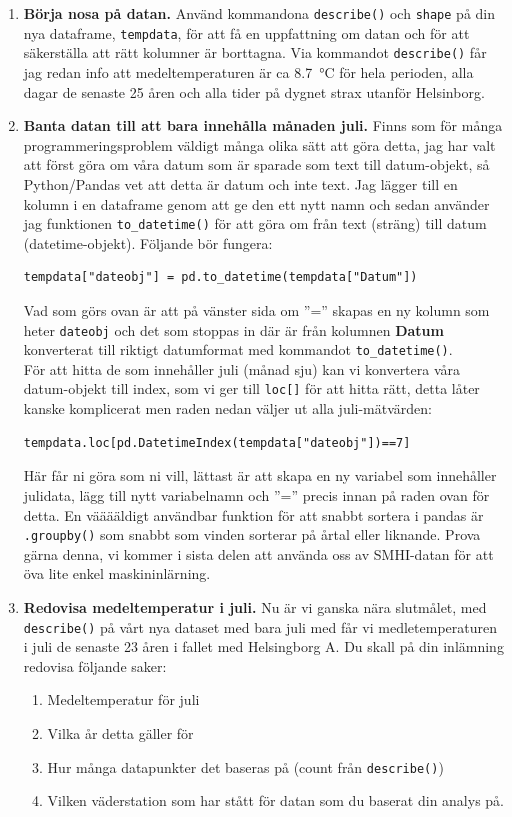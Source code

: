 \documentclass{article}
\begin{document}
\begin{enumerate}
    \item \textbf{Börja nosa på datan.} Använd kommandona \verb+describe()+ och \verb+shape+ på din nya dataframe, \verb+tempdata+, för att få en uppfattning om datan och för att säkerställa att rätt kolumner är borttagna.  Via kommandot \verb+describe()+ får jag redan info att medeltemperaturen är ca \SI{8.7}{\celsius} för hela perioden, alla dagar de senaste 25 åren och alla tider på dygnet strax utanför Helsinborg.
    \item \textbf{Banta datan till att bara innehålla månaden juli.} Finns som för många programmeringsproblem väldigt många olika sätt att göra detta, jag har valt att först göra om våra datum som är sparade som text till datum-objekt, så Python/Pandas vet att detta är datum och inte text. Jag lägger till en kolumn i en dataframe genom att ge den ett nytt namn och sedan använder jag funktionen \verb+to_datetime()+ för att göra om från text (sträng) till datum (datetime-objekt). Följande bör fungera:
    \begin{verbatim}
tempdata["dateobj"] = pd.to_datetime(tempdata["Datum"])        
    \end{verbatim}
    Vad som görs ovan är att på vänster sida om ”=” skapas en ny kolumn som heter \verb+dateobj+ och det som stoppas in där är från kolumnen \textbf{Datum} konverterat till riktigt datumformat med kommandot \verb+to_datetime()+.\\
    För att hitta de som innehåller juli (månad sju) kan vi konvertera våra datum-objekt till index, som vi ger till \verb+loc[]+ för att hitta rätt, detta låter kanske komplicerat men raden nedan väljer ut alla juli-mätvärden:
\begin{verbatim}
tempdata.loc[pd.DatetimeIndex(tempdata["dateobj"])==7]
\end{verbatim}        
Här får ni göra som ni vill, lättast är att skapa en ny variabel som innehåller julidata, lägg till nytt variabelnamn och ”=” precis innan på raden ovan för detta. En vääääldigt användbar funktion för att snabbt sortera i pandas är \verb+.groupby()+ som snabbt som vinden sorterar på årtal eller liknande. Prova gärna denna, vi kommer i sista delen att använda oss av SMHI-datan för att öva lite enkel maskininlärning.
\item \textbf{Redovisa medeltemperatur i juli.} Nu är vi ganska nära slutmålet, med \verb+describe()+ på vårt nya dataset med bara juli med får vi medletemperaturen i juli de senaste 23 åren i fallet med Helsingborg A. Du skall på din inlämning redovisa följande saker:
\begin{enumerate}
    \item Medeltemperatur för juli
    \item Vilka år detta gäller för
    \item Hur många datapunkter det baseras på (count från \verb+describe()+)
    \item Vilken väderstation som har stått för datan som du baserat din analys på.
\end{enumerate}


\end{enumerate}
\end{document}
